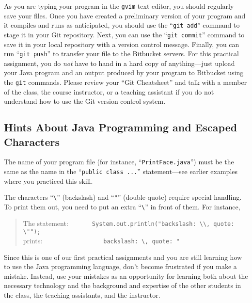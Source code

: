 As you are typing your program in the {\tt gvim} text editor, you should regularly save your files.  Once you have
created a preliminary version of your program and it compiles and runs as anticipated, you should use the ``{\tt git
add}'' command to stage it in your Git repository.  Next, you can use the ``{\tt git commit}'' command to save it in
your local repository with a version control message.  Finally, you can run ``{\tt git push}'' to transfer your file to
the Bitbucket servers.  For this practical assignment, you do {\em not} have to hand in a hard copy of anything---just
upload your Java program and an output produced by your program to Bitbucket using the {\tt git} commands.  Please
review your ``Git Cheatsheet'' and talk with a member of the class, the course instructor, or a teaching assistant if
you do not understand how to use the Git version control system.

\vspace*{-.1in}
\subsection*{Hints About Java Programming and Escaped Characters}
\vspace*{-.05in}

The name of your program file (for instance, ``{\tt PrintFace.java}'') must be the same as the name in the ``{\tt public
  class ...}'' statement---see earlier examples where you practiced this skill.

The characters ``\verb$\$'' (backslash) and ``\verb$"$'' (double-quote)
require special handling. To print them out, you need to put an extra
``\verb$\$'' in front of them. For instance,

\vspace*{-.1in}
\begin{quote}
The statement:\ \ \ \ \ \ \ \verb$System.out.println("backslash: \\, quote: \"");$\\
prints:\ \ \ \ \ \ \ \ \ \ \ \ \ \ \ \ \ \
\verb$backslash: \, quote: "$
\end{quote}
\vspace*{-.1in}

Since this is one of our first practical assignments and you are still learning how to use the Java programming
language, don't become frustrated if you make a mistake. Instead, use your mistakes as an opportunity for learning both
about the necessary technology and the background and expertise of the other students in the class, the teaching
assistants, and the instructor.

